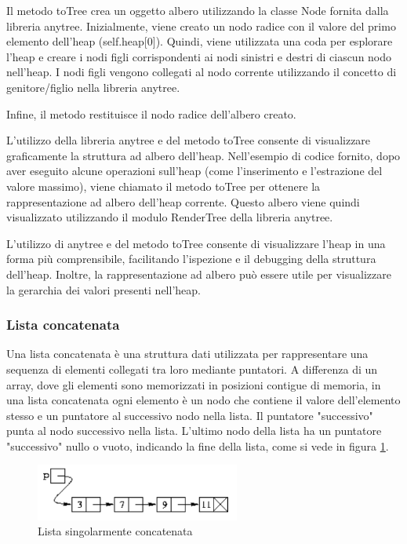 \documentclass{article}
\begin{document}
Il metodo toTree crea un oggetto albero utilizzando la classe Node fornita dalla libreria anytree. Inizialmente, viene creato un nodo radice con il valore del primo elemento dell'heap (self.heap[0]). Quindi, viene utilizzata una coda per esplorare l'heap e creare i nodi figli corrispondenti ai nodi sinistri e destri di ciascun nodo nell'heap. I nodi figli vengono collegati al nodo corrente utilizzando il concetto di genitore/figlio nella libreria anytree.

Infine, il metodo restituisce il nodo radice dell'albero creato.

L'utilizzo della libreria anytree e del metodo toTree consente di visualizzare graficamente la struttura ad albero dell'heap. Nell'esempio di codice fornito, dopo aver eseguito alcune operazioni sull'heap (come l'inserimento e l'estrazione del valore massimo), viene chiamato il metodo toTree per ottenere la rappresentazione ad albero dell'heap corrente. Questo albero viene quindi visualizzato utilizzando il modulo RenderTree della libreria anytree.

L'utilizzo di anytree e del metodo toTree consente di visualizzare l'heap in una forma più comprensibile, facilitando l'ispezione e il debugging della struttura dell'heap. Inoltre, la rappresentazione ad albero può essere utile per visualizzare la gerarchia dei valori presenti nell'heap.

\subsubsection{Lista concatenata}
Una lista concatenata è una struttura dati utilizzata per rappresentare una sequenza di elementi collegati tra loro mediante puntatori. A differenza di un array, dove gli elementi sono memorizzati in posizioni contigue di memoria, in una lista concatenata ogni elemento è un nodo che contiene il valore dell'elemento stesso e un puntatore al successivo nodo nella lista. Il puntatore "successivo" punta al nodo successivo nella lista. L'ultimo nodo della lista ha un puntatore "successivo" nullo o vuoto, indicando la fine della lista, come si vede in figura \ref{fig: Linked1}.

\begin{figure}[H]
    \includegraphics[width=0.6\textwidth]{Images/Linked1.png}
    \centering
    \caption{Lista singolarmente concatenata}
    \label{fig: Linked1}
\end{figure}
\end{document}
